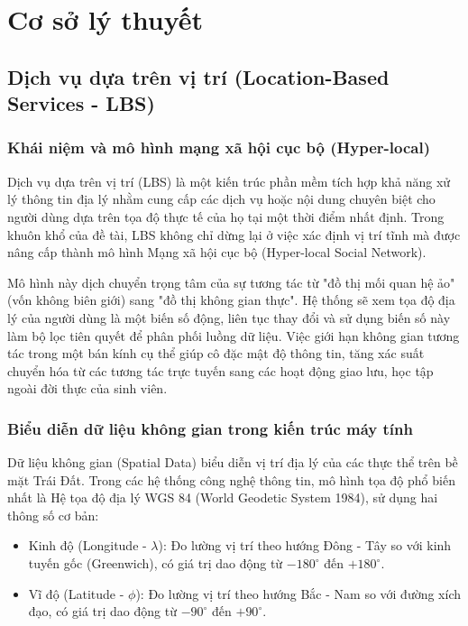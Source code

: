 \chapter{Cơ sở lý thuyết}
\section{Dịch vụ dựa trên vị trí (Location-Based Services - LBS)}
\subsection{Khái niệm và mô hình mạng xã hội cục bộ (Hyper-local)}

Dịch vụ dựa trên vị trí (LBS) là một kiến trúc phần mềm tích hợp khả năng xử lý thông tin địa lý nhằm cung cấp các dịch vụ hoặc nội dung chuyên biệt cho người dùng dựa trên tọa độ thực tế của họ tại một thời điểm nhất định. Trong khuôn khổ của đề tài, LBS không chỉ dừng lại ở việc xác định vị trí tĩnh mà được nâng cấp thành mô hình Mạng xã hội cục bộ (Hyper-local Social Network).

Mô hình này dịch chuyển trọng tâm của sự tương tác từ "đồ thị mối quan hệ ảo" (vốn không biên giới) sang "đồ thị không gian thực". Hệ thống sẽ xem tọa độ địa lý của người dùng là một biến số động, liên tục thay đổi và sử dụng biến số này làm bộ lọc tiên quyết để phân phối luồng dữ liệu. Việc giới hạn không gian tương tác trong một bán kính cụ thể giúp cô đặc mật độ thông tin, tăng xác suất chuyển hóa từ các tương tác trực tuyến sang các hoạt động giao lưu, học tập ngoài đời thực của sinh viên.

\subsection{Biểu diễn dữ liệu không gian trong kiến trúc máy tính}

Dữ liệu không gian (Spatial Data) biểu diễn vị trí địa lý của các thực thể trên bề mặt Trái Đất. Trong các hệ thống công nghệ thông tin, mô hình tọa độ phổ biến nhất là Hệ tọa độ địa lý WGS 84 (World Geodetic System 1984), sử dụng hai thông số cơ bản\cite{national1984department}:

\begin{itemize}
    \item Kinh độ (Longitude - $\lambda$): Đo lường vị trí theo hướng Đông - Tây so với kinh tuyến gốc (Greenwich), có giá trị dao động từ $-180^\circ$ đến $+180^\circ$.
    \item Vĩ độ (Latitude - $\phi$): Đo lường vị trí theo hướng Bắc - Nam so với đường xích đạo, có giá trị dao động từ $-90^\circ$ đến $+90^\circ$.
\end{itemize}


